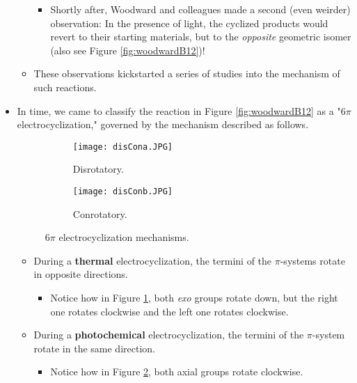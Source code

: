 \documentclass[../notes.tex]{subfiles}
\begin{document}
\begin{itemize}
\begin{itemize}
\begin{itemize}
            \item Shortly after, Woodward and colleagues made a second (even weirder) observation: In the presence of light, the cyclized products would revert to their starting materials, but to the \emph{opposite} geometric isomer (also see Figure \ref{fig:woodwardB12})!
        \end{itemize}
        \item These observations kickstarted a series of studies into the mechanism of such reactions.
    \end{itemize}
    \item In time, we came to classify the reaction in Figure \ref{fig:woodwardB12} as a "$6\pi$ electrocyclization," governed by the mechanism described as follows.
    \begin{figure}[h!]
        \centering
        \begin{subfigure}[b]{0.25\linewidth}
            \centering
            \texttt{[image: disCona.JPG]}
            \caption{Disrotatory.}
            \label{fig:disCona}
        \end{subfigure}
        \begin{subfigure}[b]{0.25\linewidth}
            \centering
            \texttt{[image: disConb.JPG]}
            \caption{Conrotatory.}
            \label{fig:disConb}
        \end{subfigure}
        \caption{$6\pi$ electrocyclization mechanisms.}
        \label{fig:disCon}
    \end{figure}
    \pagebreak
    \begin{itemize}
        \item During a \textbf{thermal} electrocyclization, the termini of the $\pi$-systems rotate in opposite directions.
        \begin{itemize}
            \item Notice how in Figure \ref{fig:disCona}, both \emph{exo} groups rotate down, but the right one rotates clockwise and the left one rotates clockwise.
        \end{itemize}
        \item During a \textbf{photochemical} electrocyclization, the termini of the $\pi$-system rotate in the same direction.
        \begin{itemize}
            \item Notice how in Figure \ref{fig:disConb}, both axial groups rotate clockwise.
        \end{itemize}

\end{itemize}
\end{itemize}
\end{document}
